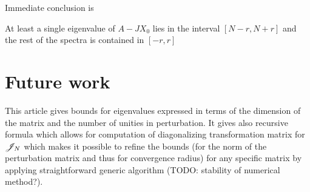 \documentclass{article}
\begin{document}
Immediate conclusion is
\begin{lemma}
    At least a single eigenvalue of $A-JX_0$ lies in the interval $\left[N-r,N+r\right]$
    and the rest of the spectra is contained in $\left[-r,r\right]$
\end{lemma}

%

\section{Future work}
This article gives bounds for eigenvalues expressed in terms of the dimension of the matrix and the number of unities in perturbation.
It gives also recursive formula which allows for computation of diagonalizing transformation matrix for $\mathscr{J}_{N}$
which makes it possible to refine the bounds (for the norm of the perturbation matrix and thus for convergence radius)
for any specific matrix by applying straightforward generic algorithm (TODO: stability of numerical method?).
\end{document}
